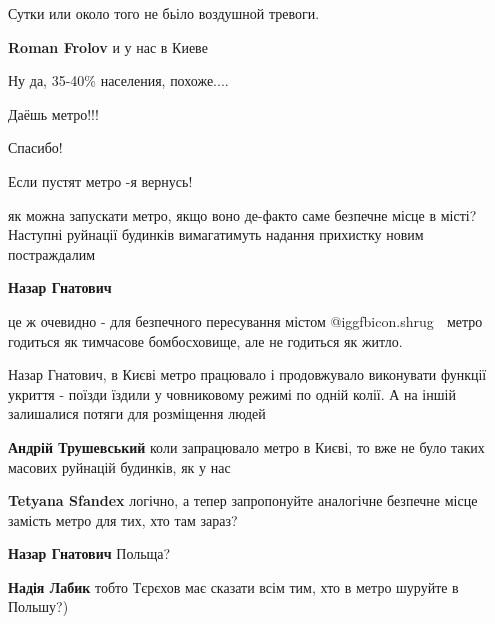  
 
 
 
 
\zzSecCmt

\begin{itemize} %


Сутки или около того не бьіло воздушной тревоги.

\textbf{Roman Frolov} и у нас в Киеве

Ну да, 35-40\% населения, похоже....

Даёшь метро!!!

Спасибо!

Если пустят метро -я вернусь!


як можна запускати метро, якщо воно де-факто саме безпечне місце в місті?
Наступні руйнації будинків вимагатимуть надання прихистку новим постраждалим

\begin{itemize} %
\textbf{Назар Гнатович} 

це ж очевидно - для безпечного пересування містом  @igg{fbicon.shrug} 🏻 метро годиться як
тимчасове бомбосховище, але не годиться як житло.


Назар Гнатович, в Києві метро працювало і продовжувало виконувати функції
укриття - поїзди їздили у човниковому режимі по одній колії. А на іншій
залишалися потяги для розміщення людей

\textbf{Андрій Трушевський} коли запрацювало метро в Києві, то вже не було таких масових руйнацій будинків, як у нас

\textbf{Tetyana Sfandex} логічно, а тепер запропонуйте аналогічне безпечне місце замість метро для тих, хто там зараз?

\textbf{Назар Гнатович} Польща?

\textbf{Надія Лабик} тобто Тєрєхов має сказати всім тим, хто в метро шуруйте в Польшу?)


\end{itemize}
\end{itemize}
